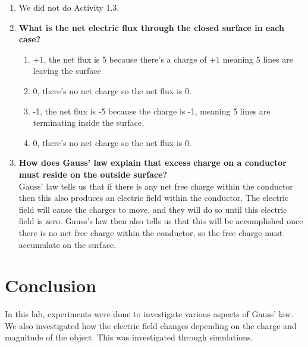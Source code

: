\documentclass[oneside,12pt]{amsart}
\begin{document}
\begin{enumerate}
	\item We did not do Activity 1.3.
	\item \textbf{What is the net electric flux through the closed surface in each case?}
	\begin{enumerate}
		\item +1, the net flux is 5 because there’s a charge of +1 meaning 5 lines are leaving the surface
		\item 0, there’s no net charge so the net flux is 0.
		\item -1, the net flux is -5 because the charge is -1, meaning 5 lines are terminating inside the surface.
		\item 0, there’s no net charge so the net flux is 0.
	\end{enumerate}
	\item \textbf{How does Gauss’ law explain that excess charge on a conductor must reside on the outside surface?
	}\\
\indent Gauss’ law tells us that if there is any net free charge within the conductor then this also produces an electric field within the conductor. The electric field will cause the charges to move, and they will do so until this electric field is zero. Gauss's law then also tells us that this will be accomplished once there is no net free charge within the conductor, so the free charge must accumulate on the surface.

\end{enumerate}
\section{Conclusion}
In this lab, experiments were done to investigate various aspects of Gauss’ law. We also investigated how the electric field changes depending on the charge and magnitude of the object. This was investigated through simulations. 





	
	
\end{document}
